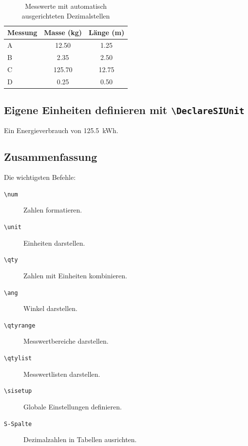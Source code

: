 \documentclass[11pt,a4paper]{scrartcl}
\begin{document}
	\begin{table}[htbp]
		\centering
		
		\begin{tabular}{
				l
				S[table-format=3.2]
				S[table-format=2.2]
			}
			\toprule
			{Messung} &
			{Masse (\unit{\kilogram})} &
			{Länge (\unit{\metre})} \\
			\midrule
			A & 12.50  & 1.25 \\
			B & 2.35   & 2.50 \\
			C & 125.70 & 12.75 \\
			D & 0.25   & 0.50 \\
			\bottomrule
		\end{tabular}
		
		\caption{Messwerte mit automatisch
			ausgerichteten Dezimalstellen}
		
		\label{tab:siunitx-messwerte}
	\end{table}
	
	\subsection{Eigene Einheiten definieren mit \texttt{\textbackslash DeclareSIUnit}}
	
	
	Ein Energieverbrauch von
	\qty{125.5}{\kWh}.
	
	\subsection{Zusammenfassung}
	
	Die wichtigsten Befehle:
	
	\begin{description}
		
		\item[\texttt{\textbackslash num}]
		Zahlen formatieren.
		
		\item[\texttt{\textbackslash unit}]
		Einheiten darstellen.
		
		\item[\texttt{\textbackslash qty}]
		Zahlen mit Einheiten kombinieren.
		
		\item[\texttt{\textbackslash ang}]
		Winkel darstellen.
		
		\item[\texttt{\textbackslash qtyrange}]
		Messwertbereiche darstellen.
		
		\item[\texttt{\textbackslash qtylist}]
		Messwertlisten darstellen.
		
		\item[\texttt{\textbackslash sisetup}]
		Globale Einstellungen definieren.
		
		\item[\texttt{S-Spalte}]
		Dezimalzahlen in Tabellen ausrichten.
		
	\end{description}
	
\end{document}
